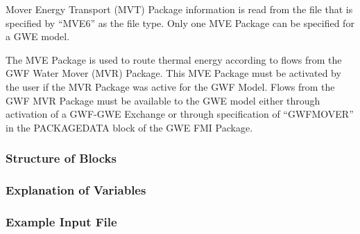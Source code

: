 Mover Energy Transport (MVT) Package information is read from the file that is specified by ``MVE6'' as the file type.  Only one MVE Package can be specified for a GWE model.  

The MVE Package is used to route thermal energy according to flows from the GWF Water Mover (MVR) Package.  This MVE Package must be activated by the user if the MVR Package was active for the GWF Model.  Flows from the GWF MVR Package must be available to the GWE model either through activation of a GWF-GWE Exchange or through specification of ``GWFMOVER'' in the PACKAGEDATA block of the GWE FMI Package.  

\vspace{5mm}
\subsubsection{Structure of Blocks}


\vspace{5mm}
\subsubsection{Explanation of Variables}
\begin{description}

\end{description}

\vspace{5mm}
\subsubsection{Example Input File}



